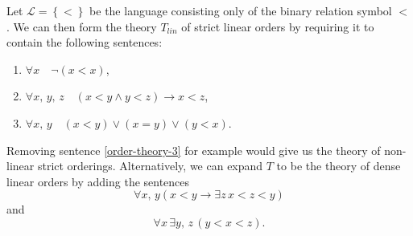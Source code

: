\documentclass[../../main.tex]{subfiles}
\begin{document}
\begin{example}\cite[Example 1.2.2]{Mar02}
    Let $\mathcal{L} = \left\{<\right\}$ be the language consisting only of the binary relation symbol $<$.
    We can then form the theory $T_{lin}$ of strict linear orders by requiring it to contain the following sentences:
    \begin{enumerate}[label=(\roman*)]
        \item \label{order-theory-1} $\forall x \quad \lnot \left(x < x\right)$,
        \item \label{order-theory-2} $\forall x,\, y,\, z \quad \left(x < y \wedge y < z\right) \rightarrow x < z$,
        \item \label{order-theory-3} $\forall x,\, y \quad \left(x < y\right) \vee \left(x = y\right) \vee \left(y < x\right)$.
    \end{enumerate}
    Removing sentence \ref{order-theory-3} for example would give us the theory of non-linear strict orderings.
    Alternatively, we can expand $T$ to be the theory of dense linear orders by adding the sentences
    $$\forall x,\, y \left(x < y \rightarrow \exists z\, x < z < y\right)$$
    and 
    $$\forall x\, \exists y,\, z \, \left(y < x < z\right).$$ 
\end{example}
\end{document}
